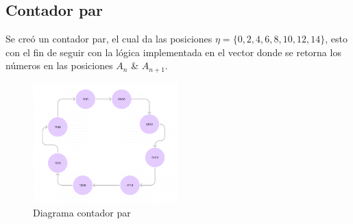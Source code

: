 \documentclass{article}
\begin{document}
\subsection{Contador par}
Se creó un contador par, el cual da las posiciones $\eta = \{ 0, 2, 4, 6, 8, 10, 12, 14 \}$, esto con el 
fin de seguir con la lógica implementada en el vector donde se retorna los números en las posiciones 
$A_n$ \& $A_{n+1}$.
\begin{figure}[h] %
    \centering
    \includegraphics[width=0.5\textwidth]{imagenes/contador_par_diagrama.png} %
    \caption{Diagrama contador par} %
    \label{fig:diagramacontadorpar} %
\end{figure}
\newpage
\end{document}
